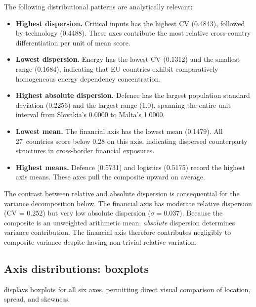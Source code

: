 The following distributional patterns are analytically relevant:

\begin{itemize}[leftmargin=2em]
  \item \textbf{Highest dispersion.}  Critical inputs has the highest
    CV (0.4843), followed by technology (0.4488).  These axes
    contribute the most relative cross-country differentiation per
    unit of mean score.

  \item \textbf{Lowest dispersion.}  Energy has the lowest CV
    (0.1312) and the smallest range (\num{0.1684}), indicating
    that EU countries exhibit comparatively homogeneous energy
    dependency concentration.

  \item \textbf{Highest absolute dispersion.}  Defence has the
    largest population standard deviation (\num{0.2256}) and
    the largest range (1.0), spanning the entire unit interval from
    Slovakia's \num{0.0000} to Malta's \num{1.0000}.

  \item \textbf{Lowest mean.}  The financial axis has the lowest mean
    (\num{0.1479}).  All 27~countries score below 0.28 on this
    axis, indicating dispersed counterparty structures in cross-border
    financial exposures.

  \item \textbf{Highest means.}  Defence (\num{0.5731}) and
    logistics (\num{0.5175}) record the highest axis means.
    These axes pull the composite upward on average.
\end{itemize}

The contrast between relative and absolute dispersion is
consequential for the variance decomposition below.  The financial
axis has moderate relative dispersion (CV = 0.252) but very low
absolute dispersion ($\sigma = 0.037$).  Because the composite is an
unweighted arithmetic mean, \emph{absolute} dispersion
determines variance contribution.  The financial
axis therefore contributes negligibly to composite variance despite having
non-trivial relative variation.

\subsection{Axis distributions: boxplots}

 displays boxplots for all six axes, permitting
direct visual comparison of location, spread, and skewness.

